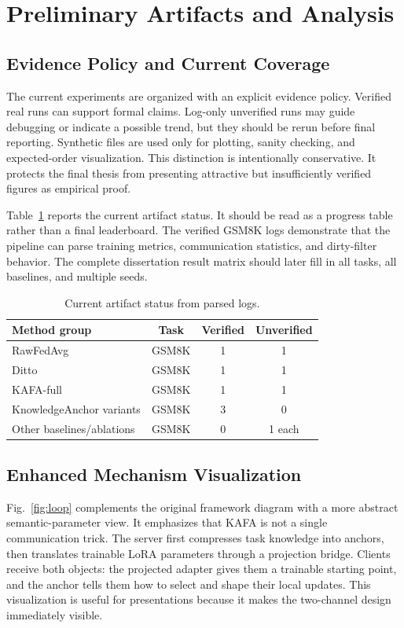 \documentclass[conference]{IEEEtran}
\begin{document}
\section{Preliminary Artifacts and Analysis}
\subsection{Evidence Policy and Current Coverage}
The current experiments are organized with an explicit evidence policy. Verified real runs can support formal claims. Log-only unverified runs may guide debugging or indicate a possible trend, but they should be rerun before final reporting. Synthetic files are used only for plotting, sanity checking, and expected-order visualization. This distinction is intentionally conservative. It protects the final thesis from presenting attractive but insufficiently verified figures as empirical proof.

Table~\ref{tab:artifact} reports the current artifact status. It should be read as a progress table rather than a final leaderboard. The verified GSM8K logs demonstrate that the pipeline can parse training metrics, communication statistics, and dirty-filter behavior. The complete dissertation result matrix should later fill in all tasks, all baselines, and multiple seeds.

\begin{table}[t]
\caption{Current artifact status from parsed logs.}
\label{tab:artifact}
\centering
\small
\begin{tabular}{lccc}
\toprule
Method group & Task & Verified & Unverified \\
\midrule
RawFedAvg & GSM8K & 1 & 1 \\
Ditto & GSM8K & 1 & 1 \\
KAFA-full & GSM8K & 1 & 1 \\
KnowledgeAnchor variants & GSM8K & 3 & 0 \\
Other baselines/ablations & GSM8K & 0 & 1 each \\
\bottomrule
\end{tabular}
\end{table}

\subsection{Enhanced Mechanism Visualization}
Fig.~\ref{fig:loop} complements the original framework diagram with a more abstract semantic-parameter view. It emphasizes that KAFA is not a single communication trick. The server first compresses task knowledge into anchors, then translates trainable LoRA parameters through a projection bridge. Clients receive both objects: the projected adapter gives them a trainable starting point, and the anchor tells them how to select and shape their local updates. This visualization is useful for presentations because it makes the two-channel design immediately visible.
\end{document}
